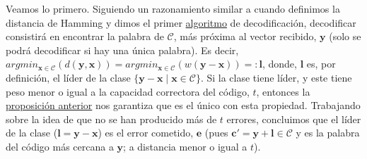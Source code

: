 \documentclass[11pt,spanish]{book}
\begin{document}
Veamos lo primero. Siguiendo un razonamiento similar a cuando definimos la distancia de Hamming y dimos el primer \hyperlink{algoritmo}{algoritmo} de decodificación, decodificar consistirá en encontrar la palabra de $\mathcal{C}$, más próxima al vector recibido, $\mathbf{y}$ (solo se podrá decodificar si hay una única palabra). Es decir,  $argmin_{\mathbf{x}\in\mathcal{C}}(d(\mathbf{y},\mathbf{x}))=argmin_{\mathbf{x}\in\mathcal{C}}(w(\mathbf{y}-\mathbf{x}))=:\mathbf{l}$, donde, $\mathbf{l}$ es, por definición, el líder de la clase $\{\mathbf{y}-\mathbf{x}\;|\;\mathbf{x}\in\mathcal{C}\}$. Si la clase tiene líder, y este tiene peso menor o igual a la capacidad correctora del código, $t$, entonces la \hyperlink{prop3.10}{proposición anterior} nos garantiza que es el único con esta propiedad. Trabajando sobre la idea de que no se han producido más de $t$ errores, concluimos que el líder de la clase ($\mathbf{l}=\mathbf{y}-\mathbf{x}$) es el error cometido, $\mathbf{e}$ (pues $\mathbf{c'}=\mathbf{y}+\mathbf{l}\in\mathcal{C}$ y es la palabra del código más cercana a $\mathbf{y}$; a distancia menor o igual a $t$).\\
\end{document}
